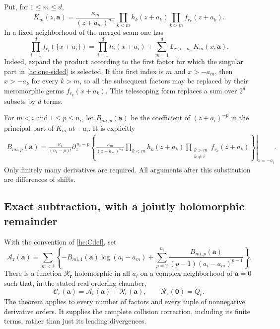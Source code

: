 Put, for $1\le m\le d$,
\begin{equation}\label{hc:Km}
 K_m(z,\boldsymbol a)=
 \frac{\kappa_m}{(z+a_m)^{n_m}}
 \prod_{k<m}h_k(z+a_k)
 \prod_{k>m}f_{r_k}(z+a_k).
\end{equation}
In a fixed neighborhood of the merged seam one has
\begin{equation}\label{hc:telescope}
 \prod_{i=1}^d f_{r_i}(\{x+a_i\})
 =\prod_{i=1}^d h_i(x+a_i)
      +\sum_{m=1}^d\mathbf1_{x>-a_m}K_m(x,\boldsymbol a).
\end{equation}
Indeed, expand the product according to the first factor for which the
singular part in \eqref{hc:one-sided} is selected. If this first index is
$m$ and $x>-a_m$, then $x>-a_k$ for every $k>m$, so all the subsequent
factors may be replaced by their meromorphic germs $f_{r_k}(x+a_k)$.
This telescoping form replaces a sum over $2^d$ subsets by $d$ terms.

For $m<i$ and $1\le p\le n_i$, let $B_{mi,p}(\boldsymbol a)$ be the
coefficient of $(z+a_i)^{-p}$ in the principal part of $K_m$ at $-a_i$.
It is explicitly
\begin{align}
 B_{mi,p}(\boldsymbol a)
 =\frac{\kappa_i}{(n_i-p)!}
 \left.\partial_z^{\,n_i-p}\left\{
 \frac{\kappa_m}{(z+a_m)^{n_m}}
 \prod_{k<m}h_k(z+a_k)
 \prod_{\substack{k>m\\k\ne i}}f_{r_k}(z+a_k)
 \right\}\right|_{z=-a_i}.
 \label{hc:B}
\end{align}
Only finitely many derivatives are required. All arguments after
this substitution are differences of shifts.

\subsection{Exact subtraction, with a jointly holomorphic remainder}

\begin{theorem}\label{hc:main}
With the convention of \eqref{hc:Cdef}, set
\begin{equation}\label{hc:counter}
 \mathcal A_{\boldsymbol r}(\boldsymbol a)=
 \sum_{m<i}\left\{
 -B_{mi,1}(\boldsymbol a)\log(a_i-a_m)
 +\sum_{p=2}^{n_i}
  \frac{B_{mi,p}(\boldsymbol a)}{(p-1)(a_i-a_m)^{p-1}}
 \right\}.
\end{equation}
There is a function $\mathcal R_{\boldsymbol r}$ holomorphic in all
$a_i$ on a complex neighborhood of $\boldsymbol a=0$ such that, in
the stated real ordering chamber,
\begin{equation}\label{hc:exact}
 \boxed{\quad
 \mathcal C_{\boldsymbol r}(\boldsymbol a)
 =\mathcal A_{\boldsymbol r}(\boldsymbol a)
       +\mathcal R_{\boldsymbol r}(\boldsymbol a),\qquad
 \mathcal R_{\boldsymbol r}(\boldsymbol0)=Q_{\boldsymbol r}.
 \quad}
\end{equation}
The theorem applies to every number of factors and every tuple of
nonnegative derivative orders. It supplies the complete collision
correction, including its finite terms, rather than just its leading
divergences.
\end{theorem}

